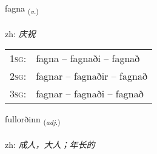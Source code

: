 \documentclass[frontgrid, backgrid]{flacards}\usepackage[]{graphicx}\usepackage[]{color}
\begin{document}
\renewcommand{\flhead}{\vskip5pt \fboxsep=0pt {\small\bfseries\footnotesize Sagnorð | 动词}}
\renewcommand{\fcfoot}{\vskip5pt \fboxsep=0pt \hspace{2pt}{\small\bfseries\footnotesize 2K}}

\renewcommand{\blhead}{\vskip5pt {\small\bfseries\footnotesize Sagnorð | 动词 }}
\renewcommand{\bcfoot}{\vskip5pt \hspace{2pt}{\small\bfseries\footnotesize 2K}}


{fagna \small{\textsubscript{(\textit{v.})}} \\[1ex] %
\textphonetic{[fakna]} \\
zh: \emph{庆祝} \\  [2ex]
\renewcommand*{\arraystretch}{0.8}
\begin{tabular}{p{1cm}l}
\textsc{1sg}: & fagna -- fagnaði -- fagnað \\ 
\textsc{2sg}: & fagnar -- fagnaðir -- fagnað \\ 
\textsc{3sg}: & fagnar -- fagnaði -- fagnað \\ 
\end{tabular}
}

\renewcommand{\flhead}{\vskip5pt \fboxsep=0pt {\small\bfseries\footnotesize Lýsingarorð | 形容词}}
\renewcommand{\fcfoot}{\vskip5pt \fboxsep=0pt \hspace{2pt}{\small\bfseries\footnotesize 2K}}

\renewcommand{\blhead}{\vskip5pt {\small\bfseries\footnotesize Lýsingarorð | 形容词 }}
\renewcommand{\bcfoot}{\vskip5pt \hspace{2pt}{\small\bfseries\footnotesize 2K}}


{fullorðinn \small{\textsubscript{(\textit{adj.})}} \\[1ex] %
\textphonetic{[fʏtlɔrðɪn]} \\
zh: \emph{成人，大人；年长的} \\  [2ex]
\renewcommand*{\arraystretch}{0.8}
}
\end{document}
